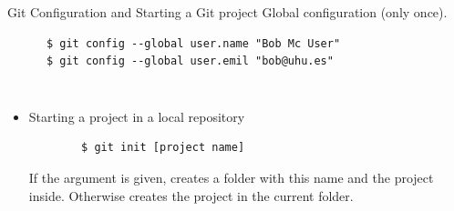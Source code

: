 \begin{frame}[t,fragile]{Git Configuration and Starting a Git project}
    \alert{Global configuration} (only once).
    \begin{lstlisting}
      $ git config --global user.name "Bob Mc User"
      $ git config --global user.emil "bob@uhu.es"
    \end{lstlisting}%

  \begin{columns}
    {\scriptsize
      \begin{itemize}
      \item \alert{Starting} a project in a \alert{local} repository
      \begin{lstlisting}
        $ git init [project name]
      \end{lstlisting}

      If the argument is given, creates a folder with this name and the project inside. Otherwise creates the project in the current folder.
      

\end{itemize}}
\end{columns}
\end{frame}
